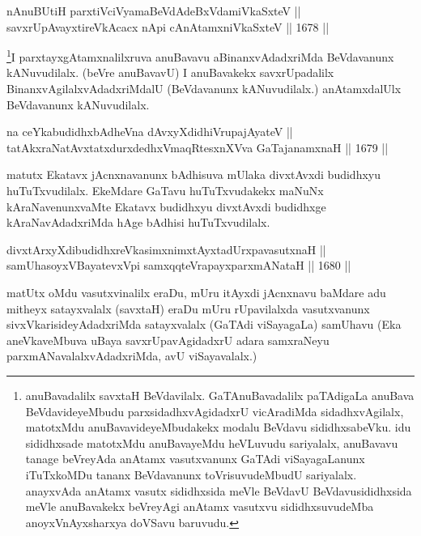 \begin{shl}
nAnuBUtiH parxtiVciVyamaBeVdAdeBxVdamiVkaSxteV || \\
savxrUpAvayxtireVkAcacx nApi cAnAtamxniVkaSxteV ||  1678 ||  
\end{shl}

\begin{artha}
\footnote{anuBavadalilx savxtaH BeVdavilalx. GaTAnuBavadalilx paTAdigaLa anuBava BeVdavideyeMbudu parxsidadhxvAgidadxrU vicAradiMda sidadhxvAgilalx, matotxMdu anuBavavideyeMbudakekx modalu BeVdavu sididhxsabeVku. idu sididhxsade matotxMdu anuBavayeMdu heVLuvudu sariyalalx, anuBavavu tanage beVreyAda anAtamx vasutxvanunx GaTAdi viSayagaLanunx iTuTxkoMDu tananx BeVdavanunx toVrisuvudeMbudU sariyalalx. anayxvAda anAtamx vasutx sididhxsida meVle BeVdavU BeVdavusididhxsida meVle anuBavakekx beVreyAgi anAtamx vasutxvu sididhxsuvudeMba anoyxVnAyxsharxya doVSavu baruvudu.}I parxtayxgAtamxnalilxruva anuBavavu aBinanxvAdadxriMda BeVdavanunx kANuvudilalx. (beVre anuBavavU) I anuBavakekx savxrUpadalilx BinanxvAgilalxvAdadxriMdalU (BeVdavanunx kANuvudilalx.) anAtamxdalUlx BeVdavanunx kANuvudilalx. 
\end{artha}


\begin{shl}
na ceYkabudidhxbAdheVna dAvxyXdidhiVrupajAyateV || \\
tatAkxraNatAvxtatxdurxdedhxVmaqRtesxnXVva GaTajanamxnaH ||  1679 ||  
\end{shl}

\begin{artha}
matutx Ekatavx jAcnxnavanunx bAdhisuva mUlaka divxtAvxdi budidhxyu huTuTxvudilalx. EkeMdare GaTavu huTuTxvudakekx maNuNx kAraNavenunxvaMte Ekatavx budidhxyu divxtAvxdi budidhxge kAraNavAdadxriMda hAge bAdhisi huTuTxvudilalx.
\end{artha}

\begin{shl}
divxtArxyXdibudidhxreVkasimxnimxtAyx\s tadUrxpavasutxnaH || \\
samUhasoyxVBayatevxV\s pi samxqqteVrapayxparxmANataH ||  1680 ||  
\end{shl}

\begin{artha}
matUtx oMdu vasutxvinalilx eraDu, mUru itAyxdi jAcnxnavu baMdare adu mitheyx satayxvalalx (savxtaH) eraDu mUru rUpavilalxda vasutxvanunx sivxVkarisideyAdadxriMda satayxvalalx (GaTAdi viSayagaLa) samUhavu (Eka aneVkaveMbuva uBaya savxrUpavAgidadxrU adara samxraNeyu parxmANavalalxvAdadxriMda, avU viSayavalalx.)
\end{artha}

